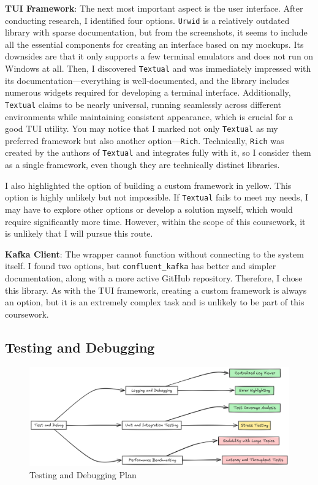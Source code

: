 \documentclass[10pt , a4paper]{report}
\begin{document}
\textbf{TUI Framework}: The next most important aspect is the user interface. After conducting research, I identified four options. \texttt{Urwid} is a relatively outdated library with sparse documentation, but from the screenshots, it seems to include all the essential components for creating an interface based on my mockups. Its downsides are that it only supports a few terminal emulators and does not run on Windows at all. Then, I discovered \texttt{Textual} and was immediately impressed with its documentation—everything is well-documented, and the library includes numerous widgets required for developing a terminal interface. Additionally, \texttt{Textual} claims to be nearly universal, running seamlessly across different environments while maintaining consistent appearance, which is crucial for a good TUI utility. You may notice that I marked not only \texttt{Textual} as my preferred framework but also another option—\texttt{Rich}. Technically, \texttt{Rich} was created by the authors of \texttt{Textual} and integrates fully with it, so I consider them as a single framework, even though they are technically distinct libraries.

I also highlighted the option of building a custom framework in yellow. This option is highly unlikely but not impossible. If \texttt{Textual} fails to meet my needs, I may have to explore other options or develop a solution myself, which would require significantly more time. However, within the scope of this coursework, it is unlikely that I will pursue this route.

\textbf{Kafka Client}: The wrapper cannot function without connecting to the system itself. I found two options, but \texttt{confluent\_kafka} has better and simpler documentation, along with a more active GitHub repository. Therefore, I chose this library. As with the TUI framework, creating a custom framework is always an option, but it is an extremely complex task and is unlikely to be part of this coursework.

\subsection{Testing and Debugging}

\begin{figure}[htbp]
    \centering
    \includegraphics[width=1\linewidth]{imgs/TestDebugDiagram.png}
    \caption{Testing and Debugging Plan}
    \label{fig:test_debug}
\end{figure}
\end{document}
